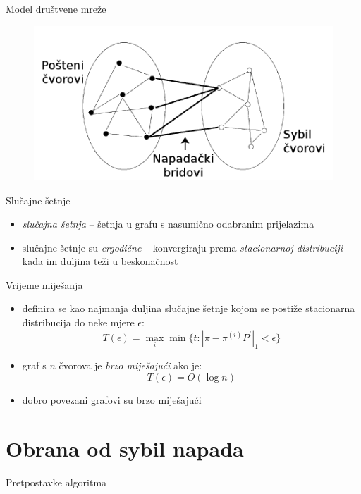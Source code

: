 \documentclass{beamer}
\begin{document}
\begin{frame}{Model društvene mreže}
  \begin{figure}[h]
    \centering
    \includegraphics[scale=0.3]{attack.png}
  \end{figure}
\end{frame}

\begin{frame}{Slučajne šetnje}
  \begin{itemize}
    \item \textit{slučajna šetnja} -- šetnja u grafu s nasumično odabranim prijelazima
    \item slučajne šetnje su \textit{ergodične} -- konvergiraju prema \textit{stacionarnoj distribuciji} kada im duljina teži u beskonačnost
  \end{itemize}
\end{frame}

\begin{frame}{Vrijeme miješanja}
  \begin{itemize}
    \item definira se kao najmanja duljina slučajne šetnje kojom se postiže stacionarna distribucija do neke mjere $\epsilon$:
      \[ T(\epsilon) = \max_{i} \min \{t : |\pi - \pi^{(i)} P^t|_1 < \epsilon\} \]
    \item graf s $n$ čvorova je \textit{brzo miješajući} ako je:
      \[ T(\epsilon) = O(\log n) \]
    \item dobro povezani grafovi su brzo miješajući
  \end{itemize}
\end{frame}

\section{Obrana od sybil napada}

\begin{frame}{Pretpostavke algoritma}
  \begin{itemize}
  \end{itemize}
\end{frame}
\end{document}
